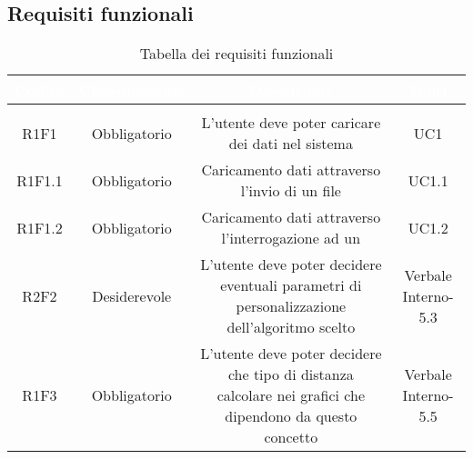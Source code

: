 \subsection{Requisiti funzionali}
\renewcommand{\arraystretch}{1.5}
\begin{center}
\begin{longtable}{C{\colA} C{\colB} C{\colC} C{\colA}}
		\textcolor{white}{\textbf{Codice}} & 
		\textcolor{white}{\textbf{Classificazione}} & 
		\textcolor{white}{\textbf{Descrizione}} & 
		\textcolor{white}{\textbf{Fonti}} \\
		\endfirsthead
	    \\
	    \endfoot
	    \caption{Tabella dei requisiti funzionali}
	    \endlastfoot

R1F1 & Obbligatorio & L'utente deve poter caricare dei dati nel sistema & UC1\\
R1F1.1 & Obbligatorio & Caricamento dati attraverso l'invio di un file  & UC1.1\\
R1F1.2 & Obbligatorio & Caricamento dati attraverso l'interrogazione ad un  & UC1.2\\

R2F2 & Desiderevole & L'utente deve poter decidere eventuali parametri di personalizzazione dell'algoritmo scelto & Verbale Interno-5.3\\

R1F3 & Obbligatorio & L'utente deve poter decidere che tipo di distanza calcolare nei grafici che dipendono da questo concetto & Verbale Interno-5.5\\


\end{longtable}
\end{center}
